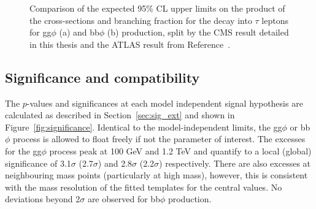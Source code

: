 \begin{figure}[!hbtp]
\centering
\caption{Comparison of the expected 95\% CL upper limits on the product of the cross-sections and branching fraction for the decay into $\tau$ leptons for gg$\phi$ (a) and bb$\phi$ (b) production, split by the CMS result detailed in this thesis and the ATLAS result from Reference~\cite{ATLAS:2020zms}.}
\label{fig:model_independent_limits_ATLAS}
\end{figure}

\subsection{Significance and compatibility}
\label{sec:sig_and_compat}

The $p$-values and significances at each model independent signal hypothesis are calculated as described in Section~\ref{sec:sig_ext} and shown in Figure~\ref{fig:significance}.
Identical to the model-independent limits, the gg$\phi$ or bb$\phi$ process is allowed to float freely if not the parameter of interest.
The excesses for the gg$\phi$ process peak at 100 GeV and 1.2 TeV and quantify to a local (global) significance of 3.1$\sigma$ (2.7$\sigma$) and 2.8$\sigma$ (2.2$\sigma$) respectively.
There are also excesses at neighbouring mass points (particularly at high mass), however, this is consistent with the mass resolution of the fitted templates for the central values.
No deviations beyond 2$\sigma$ are observed for bb$\phi$ production. \\

